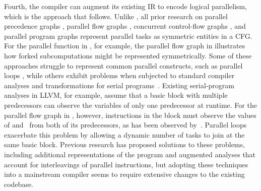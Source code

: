 Fourth, the compiler can augment its existing IR to encode logical
parallelism, which is the approach that \tapir follows.  Unlike
\tapir, all prior research on parallel precedence graphs
\cite{SrinivasanWo91, SrinivasanHoWo93}, parallel flow graphs
\cite{SrinivasanGr91, GrunwaldSr93}, concurrent control-flow graphs
\cite{LeeMiPa97, NovilloUnSc98}, and parallel program graphs
\cite{SarkarSi94, Sarkar97} represent parallel tasks as symmetric
entities in a CFG\@.
For the parallel  function in , for
example, the parallel flow graph in  illustrates how
forked subcomputations might be represented symmetrically.  Some of
these approaches struggle to represent common parallel constructs,
such as parallel loops \cite{LeeMiPa97, KhaldiJoAn12}, while others
exhibit problems when subjected to standard compiler analyses and
transformations for serial programs~\cite{LeeMiPa97, Sarkar97,
  GrunwaldSr93, KnoopStVo96, SrinivasanWo91, SrinivasanHoWo93,
  RuginaRi03}.  Existing serial-program analyses in LLVM, for example,
assume that a basic block with multiple predecessors can observe the
variables of only one predecessor at runtime.  For the parallel flow
graph in , however, instructions in the 
block must observe the values of  and~ from both of
its predecessors, as has been observed by~\cite{LeeMiPa97}.  Parallel
loops exacerbate this problem by allowing a dynamic number of tasks to
join at the same basic block.  Previous research \cite{RuginaRi03,
  AgarwalBaSa07} has proposed solutions to these problems, including
additional representations of the program and augmented analyses that
account for interleavings of parallel instructions, but adopting these
techniques into a mainstream compiler seems to require extensive
changes to the existing codebase.



